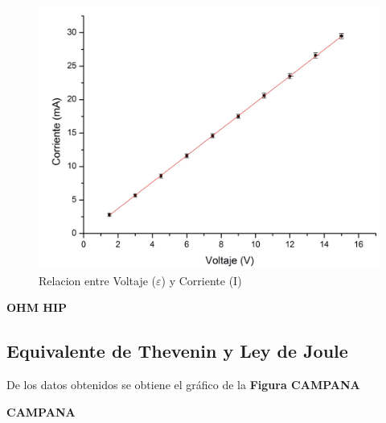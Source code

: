 \documentclass[11pt,a4paper]{article}
\begin{document}
\begin{figure}[h]
  \centering
  \includegraphics[scale=0.45]{Corriente_vs_Voltaje}
  \caption{Relacion entre Voltaje ($\varepsilon$) y Corriente (I)}
  \label{fig:Ohm_lin}
\end{figure}


\textbf{OHM HIP}


\subsection{Equivalente de Thevenin y Ley de Joule}

De los datos obtenidos se obtiene el gráfico de la \textbf{Figura CAMPANA}

\textbf{CAMPANA}

\end{document}

